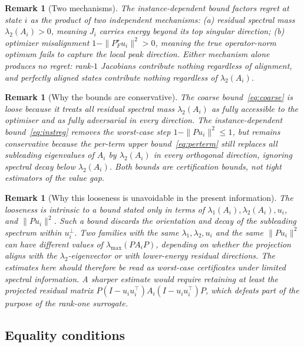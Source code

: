 \documentclass[final,3p,times]{elsarticle}
\newtheorem{remark}[theorem]{Remark}
\begin{document}
\begin{remark}[Two mechanisms]
The instance-dependent bound factors regret at state $i$ as the product
of two independent mechanisms:
(a) residual spectral mass $\lambda_2(A_i)>0$, meaning $J_i$ carries
energy beyond its top singular direction;
(b) optimizer misalignment $1-\|P_F^\star u_i\|^2>0$, meaning the
true operator-norm optimum fails to capture the local peak direction.
Either mechanism alone produces no regret: rank-$1$ Jacobians contribute
nothing regardless of alignment, and perfectly aligned states contribute
nothing regardless of $\lambda_2(A_i)$.
\end{remark}

\begin{remark}[Why the bounds are conservative]
\label{rem:looseness}
The coarse bound~\eqref{eq:coarse} is loose because it treats all
residual spectral mass $\lambda_2(A_i)$ as fully accessible to the
optimiser and as fully adversarial in every direction.
The instance-dependent bound~\eqref{eq:instreg} removes the worst-case
step $1-\|Pu_i\|^2\le 1$, but remains conservative because the per-term
upper bound~\eqref{eq:perterm} still replaces all subleading
eigenvalues of $A_i$ by $\lambda_2(A_i)$ in every orthogonal direction,
ignoring spectral decay below $\lambda_2(A_i)$.
Both bounds are certification bounds, not tight estimators of the value
gap.
\end{remark}

\begin{remark}[Why this looseness is unavoidable in the present
information]
\label{rem:sharpness}
The looseness is intrinsic to a bound stated only in terms of
$\lambda_1(A_i),\lambda_2(A_i),u_i$, and $\|Pu_i\|^2$.
Such a bound discards the orientation and decay of the subleading
spectrum within $u_i^\perp$.
Two families with the same $\lambda_1,\lambda_2,u_i$ and the same
$\|Pu_i\|^2$ can have different values of
$\lambda_{\max}(PA_iP)$, depending on whether the projection aligns
with the $\lambda_2$-eigenvector or with lower-energy residual
directions.
The estimates here should therefore be read as worst-case certificates
under limited spectral information.
A sharper estimate would require retaining at least the projected
residual matrix
$P(I-u_iu_i^\top)A_i(I-u_iu_i^\top)P$, which defeats part of the
purpose of the rank-one surrogate.
\end{remark}

\subsection{Equality conditions}
\end{document}
